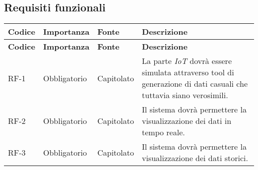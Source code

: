 \subsection{Requisiti funzionali}
\begin{longtable}{|>{\centering\arraybackslash}m{}|>{\centering\arraybackslash}m{}|>{\centering\arraybackslash}m{}|>{\centering\arraybackslash}m{}|}
	\hline
	\textbf{Codice} & \textbf{Importanza} & \textbf{Fonte} & \textbf{Descrizione}                                                                                                                                                                                                                                                                                                                                                             \\\hline
	\endfirsthead
	\hline
	\textbf{Codice} & \textbf{Importanza} & \textbf{Fonte} & \textbf{Descrizione}                                                                                                                                                                                                                                                                                                                                                             \\\hline
	\endhead
	\hline
	RF-1            & Obbligatorio        & Capitolato     & La parte \textit{IoT} dovrà essere simulata attraverso tool di generazione di dati casuali che tuttavia siano verosimili.                                                                                                                                                                                                                                                        \\\hline
	RF-2            & Obbligatorio        & Capitolato     & Il sistema dovrà permettere la visualizzazione dei dati in tempo reale.                                                                                                                                                                                                                                                                                                          \\\hline
	RF-3            & Obbligatorio        & Capitolato     & Il sistema dovrà permettere la visualizzazione dei dati storici.                                                                                                                                                                                                                                                                                                                 \\\hline

\end{longtable}

